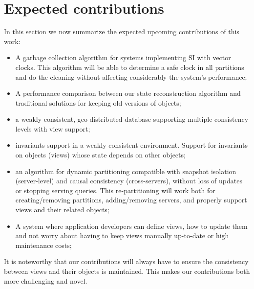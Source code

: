 \section{Expected contributions}
\label{sec:expected_contributions}

In this section we now summarize the expected upcoming contributions of this work:

\begin{itemize}
	\item A garbage collection algorithm for systems implementing SI with vector clocks. This algorithm will be able to determine a safe clock in all partitions and do the cleaning without affecting considerably the system's performance;
	\item A performance comparison between our state reconstruction algorithm and traditional solutions for keeping old versions of objects;
	\item a weakly consistent, geo distributed database supporting multiple consistency levels with view support;
	\item invariants support in a weakly consistent environment. Support for invariants on objects (views) whose state depends on other objects;
	\item an algorithm for dynamic partitioning compatible with snapshot isolation (server-level) and causal consistency (cross-servers), without loss of updates or stopping serving queries. This re-partitioning will work both for creating/removing partitions, adding/removing servers, and properly support views and their related objects;
	\item A system where application developers can define views, how to update them and not worry about having to keep views manually up-to-date or high maintenance costs;
\end{itemize}

It is noteworthy that our contributions will always have to ensure the consistency between views and their objects is maintained.
This makes our contributions both more challenging and novel.



